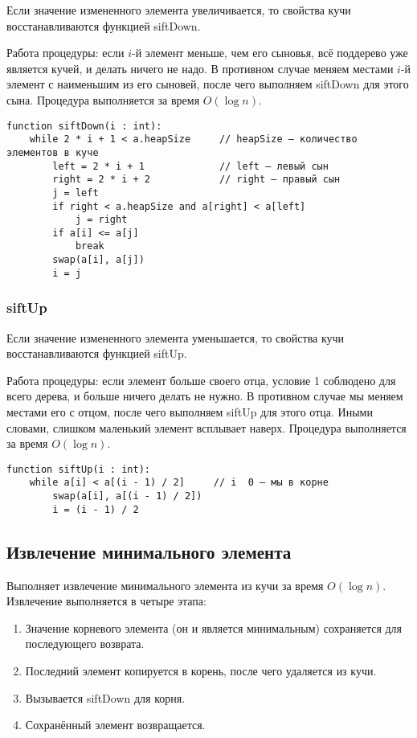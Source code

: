 Если значение измененного элемента увеличивается, то свойства кучи восстанавливаются функцией siftDown.

Работа процедуры: если $i$-й элемент меньше, чем его сыновья, всё поддерево уже является кучей, и делать ничего не надо.
В противном случае меняем местами $i$-й элемент с наименьшим из его сыновей, после чего выполняем siftDown для этого сына.
Процедура выполняется за время $O(\log n)$.

\begin{verbatim}
function siftDown(i : int):
    while 2 * i + 1 < a.heapSize     // heapSize — количество элементов в куче
        left = 2 * i + 1             // left — левый сын
        right = 2 * i + 2            // right — правый сын
        j = left
        if right < a.heapSize and a[right] < a[left]
            j = right
        if a[i] <= a[j]
            break
        swap(a[i], a[j])
        i = j
\end{verbatim}

\subsubsection{siftUp}

Если значение измененного элемента уменьшается, то свойства кучи восстанавливаются функцией siftUp.

Работа процедуры: если элемент больше своего отца, условие 1 соблюдено для всего дерева, и больше ничего делать не нужно.
В противном случае мы меняем местами его с отцом, после чего выполняем siftUp для этого отца.
Иными словами, слишком маленький элемент всплывает наверх.
Процедура выполняется за время $O(\log n)$.

\begin{verbatim}
function siftUp(i : int):
    while a[i] < a[(i - 1) / 2]     // i  0 — мы в корне
        swap(a[i], a[(i - 1) / 2])
        i = (i - 1) / 2
\end{verbatim}

\subsection{Извлечение минимального элемента}

Выполняет извлечение минимального элемента из кучи за время $O(\log n)$.
Извлечение выполняется в четыре этапа:

\begin{enumerate}
    \item Значение корневого элемента (он и является минимальным) сохраняется для последующего возврата.
    \item Последний элемент копируется в корень, после чего удаляется из кучи.
    \item Вызывается siftDown для корня.
    \item Сохранённый элемент возвращается.
\end{enumerate}

